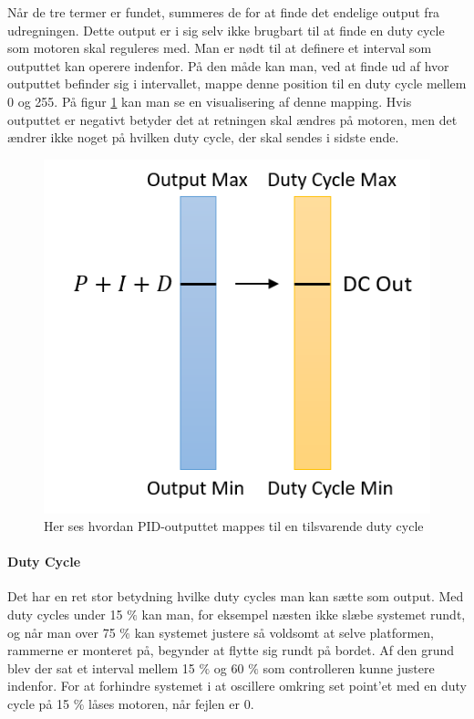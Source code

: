 Når de tre termer er fundet, summeres de for at finde det endelige output fra udregningen. Dette output er i sig selv ikke brugbart til at finde en duty cycle som motoren skal reguleres med. Man er nødt til at definere et interval som outputtet kan operere indenfor. På den måde kan man, ved at finde ud af hvor outputtet befinder sig i intervallet, mappe denne position til en duty cycle mellem 0 og 255. På figur \ref{fig:Mapping} kan man se en visualisering af denne mapping. Hvis outputtet er negativt betyder det at retningen skal ændres på motoren, men det ændrer ikke noget på hvilken duty cycle, der skal sendes i sidste ende.

\begin{figure}
	\begin{center}
	\includegraphics[scale=0.8]{Billeder/Mapping.png}
	\end{center}		
	\caption{Her ses hvordan PID-outputtet mappes til en tilsvarende duty cycle}
	\label{fig:Mapping}	
\end{figure}
\paragraph{Duty Cycle}

Det har en ret stor betydning hvilke duty cycles man kan sætte som output. Med duty cycles under 15 $\%$ kan man, for eksempel næsten ikke slæbe systemet rundt, og når man over 75 $\%$ kan systemet justere så voldsomt at selve platformen, rammerne er monteret på, begynder at flytte sig rundt på bordet. Af den grund blev der sat et interval mellem 15 $\%$ og 60 $\%$ som controlleren kunne justere indenfor. For at forhindre systemet i at oscillere omkring set point'et med en duty cycle på 15 $\%$ låses motoren, når fejlen er 0.

